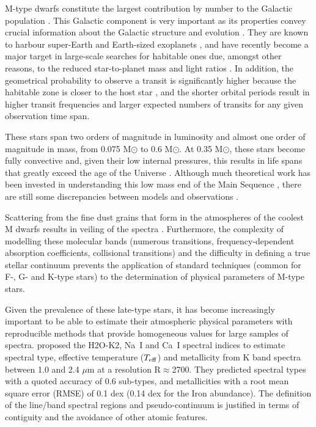 
M-type dwarfs constitute the largest contribution by number to the
Galactic population \citep{2010AJ....139.2679B}. This Galactic
component is very important as its properties convey crucial
information about the Galactic structure and
evolution \citep{2013A&A...556A.110B}. They are known to harbour
super-Earth \citep{2013A&A...556A.110B} and Earth-sized
exoplanets \citep{2015ApJ...807...45D}, and have recently become a
major target in large-scale searches for habitable ones due, amongst
other reasons, to the reduced star-to-planet mass and light
ratios \citep{2015A&A...577A.128A}. In addition, the geometrical
probability to observe a transit is significantly higher because the
habitable zone is closer to the host star \citep{Shields20161}, and
the shorter orbital periods result in higher transit frequencies and
larger expected numbers of transits for any given observation time
span.

These stars span two orders of magnitude in luminosity and almost one
order of magnitude in mass, from 0.075 M$\odot$ to 0.6 M$\odot$. At
0.35 M$\odot$, these stars become fully convective and, given their
low internal pressures, this results in life spans that greatly exceed
the age of the Universe \citep{2005AN....326..913A}. Although much
theoretical work has been invested in understanding this low mass end
of the Main Sequence \citep{2008ApJ...676.1262B}, there are still some
discrepancies between models and observations \citep[see e.g.][for an
account of the observed inflated radii and cooler temperatures with
respect to model predictions]{2013AN....334....4T}.

Scattering from the fine dust grains that form in the atmospheres
of the coolest M dwarfs results in veiling of the
spectra \citep{2012EAS....57....3A}. Furthermore, the complexity of
modelling these molecular bands (numerous transitions,
frequency-dependent absorption coefficients, collisional transitions)
and the difficulty in defining a true stellar continuum prevents the
application of standard techniques (common for F-, G- and K-type
stars) to the determination of physical parameters of M-type stars.

Given the prevalence of these late-type stars, it has become
increasingly important to be able to estimate their atmospheric
physical parameters with reproducible methods that provide homogeneous
values for large samples of spectra. \cite{2012ApJ...748...93R}
proposed the H2O-K2, Na~{\sc I} and Ca~{\sc I} spectral indices to
estimate spectral type, effective temperature ($T_{\rm eff}$) and
metallicity from K band spectra between 1.0 and 2.4 $\mu$m at a
resolution R$\approx$2700. They predicted spectral types with a quoted
accuracy of 0.6 sub-types, and metallicities with a root mean square
error (RMSE) of 0.1 dex (0.14 dex for the Iron abundance). The
definition of the line/band spectral regions and pseudo-continuum is
justified in terms of contiguity and the avoidance of other atomic
features. 


